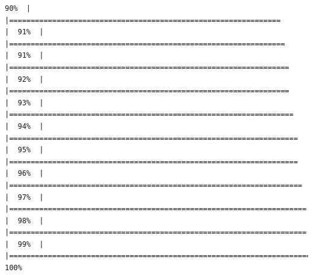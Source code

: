 \documentclass[
]{article}
\begin{document}
\begin{verbatim}
90%  |                                                                              |===============================================================       |  91%  |                                                                              |================================================================      |  91%  |                                                                              |=================================================================     |  92%  |                                                                              |=================================================================     |  93%  |                                                                              |==================================================================    |  94%  |                                                                              |===================================================================   |  95%  |                                                                              |===================================================================   |  96%  |                                                                              |====================================================================  |  97%  |                                                                              |===================================================================== |  98%  |                                                                              |===================================================================== |  99%  |                                                                              |======================================================================| 100%
\end{verbatim}
\end{document}
